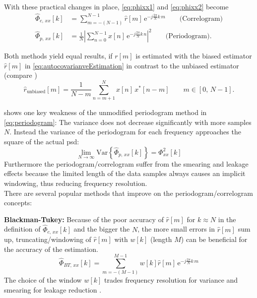 With these practical changes in place, \autoref{eq:phixx1} and \autoref{eq:phixx2} become
\begin{align}
\hat{\Phi}_{c,\,xx}[k] &= \sum_{m=-(N-1)}^{N-1} \hat{r}[m]\,\text{e}^{-j\frac{2\pi}{N}k\,m} \label{eq:phiCxx1}\qquad\text{(Correlogram)}\\
\hat{\Phi}_{p,\,xx}[k] &= \frac{1}{N} \left| \sum_{n=0}^{N-1} x[n]\,\text{e}^{-j\frac{2\pi}{N}k\,n}\right|^2\qquad\text{(Periodogram)}\label{eq:periodogram}.
\end{align}

Both methods yield equal results, if $r[m]$ is estimated with the biased estimator $\hat{r}[m]$ in \autoref{eq:autocovarianveEstimation} in contrast to the unbiased estimator (compare \cite[p.~24]{Stoica1997})
\begin{equation}
\hat{r}_{\text{unbiased}}[m] = \frac{1}{N-m} \sum_{n=m+1}^{N} x[n]\,x^\ast[n-m]\qquad m \in [0,\,N-1].
\end{equation}

\cite{Rowell2008} shows one key weakness of the unmodified periodogram method in \autoref{eq:periodogram}: The variance does not decrease significantly with more samples $N$. Instead the variance of the periodogram for each frequency approaches the square of the actual \gls{psd}:
\begin{equation}
\lim_{N\rightarrow\infty} \text{Var}\left\{\hat{\Phi}_{p,\,xx}[k]\right\} = \Phi_{xx}^2[k]
\end{equation}
Furthermore the periodogram/correlogram suffer from the smearing and leakage effects because the limited length of the data samples always causes an implicit windowing, thus reducing frequency resolution.\\

There are several popular methods that improve on the periodogram/correlogram concepts:

\textbf{Blackman-Tukey:} Because of the poor accuracy of $\hat{r}[m]$ for $k\approx N$ in the definition of $\hat{\Phi}_{c,\,xx}[k]$ and the bigger the $N$, the more small errors in $\hat{r}[m]$ sum up, truncating/windowing of $\hat{r}[m]$ with $w[k]$ (length $M$) can be beneficial for the accuracy of the estimation.
\begin{equation}
\hat{\Phi}_{BT,\,xx}[k] = \sum_{m=-(M-1)}^{M-1} w[k]\hat{r}[m]\,\text{e}^{-j\frac{2\pi}{N}k\,m}
\end{equation}
The choice of the window $w[k]$ trades frequency resolution for variance and smearing for leakage reduction \cite[p.~41]{Stoica1997}.

